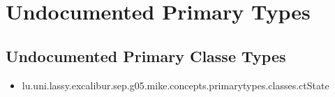 \section[Undocumented Primary Types]{Undocumented Primary Types}

\subsection[Undocumented Primary Classe Types]{Undocumented Primary Classe Types}
\begin{itemize}
\item lu.uni.lassy.excalibur.sep.g05.mike.concepts.primarytypes.classes.ctState 
\end{itemize}

























